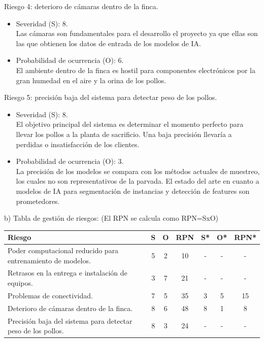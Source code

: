 \documentclass[
11pt, %
]{charter}
\begin{document}
Riesgo 4: deterioro de cámaras dentro de la finca.
\begin{itemize}
	\item Severidad (S):  8.\\
	Las cámaras son fundamentales para el desarrollo el proyecto ya que ellas son las que obtienen los datos de entrada de los modelos de IA.
	\item Probabilidad de ocurrencia (O): 6.\\
	El ambiente dentro de la finca es hostil para componentes electrónicos por la gran humedad en el aire y la orina de los pollos.
\end{itemize}

Riesgo 5: precisión baja del sistema para detectar peso de los pollos.
\begin{itemize}
	\item Severidad (S):  8.\\
	El objetivo principal del sistema es determinar el momento perfecto para llevar los pollos a la planta de sacrificio. Una baja precisión llevaría a perdidas o insatisfacción de los clientes.
	\item Probabilidad de ocurrencia (O): 3.\\
	La precisión de los modelos se compara con los métodos actuales de muestreo, los cuales no son representativos de la parvada. El estado del arte en cuanto a modelos de IA para segmentación de instancias y detección de features son prometedores.
\end{itemize}


b) Tabla de gestión de riesgos:      (El RPN se calcula como RPN=SxO)

\begin{table}[htpb]
\centering
\begin{tabularx}{\linewidth}{@{}|X|c|c|c|c|c|c|@{}}
\hline
\rowcolor[HTML]{C0C0C0} 
Riesgo & S & O & RPN & S* & O* & RPN* \\ \hline
Poder computacional reducido para entrenamiento de modelos.       & 5  &  2 & 10    & -   &  -  & -     \\ \hline
Retrasos en la entrega e instalación de equipos.       & 3  & 7  & 21    & -   & -   & -     \\ \hline
Problemas de conectividad.       & 7  & 5  &  35   & 3   & 5   &  15    \\ \hline
Deterioro de cámaras dentro de la finca.       & 8  & 6  &  48   & 8   & 1   & 8     \\ \hline
Precisión baja del sistema para detectar peso de los pollos.       & 8  & 3  &   24  & -   &  -  &   -   \\ \hline
\end{tabularx}%
\end{table}
\end{document}
